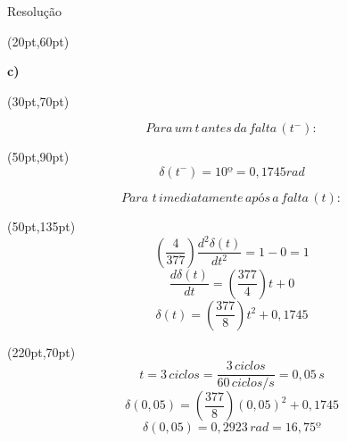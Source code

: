 \begin{frame}{Resolução}
\begin{textblock*}{10pt}(20pt,60pt)

 \textbf{c)}\\
\end{textblock*}


\begin{textblock*}{10pt}(30pt,70pt)    
\small   


\begin{equation*}
  Para\hspace{2pt} um \hspace{2pt} t \hspace{2pt} antes \hspace{2pt} da \hspace{2pt} falta \hspace{2pt} (t^-):
\end{equation*}
\begin{textblock*}{10pt}(50pt,90pt)
\begin{equation*}
  \delta(t^-) = 10º = 0,1745 rad
\end{equation*}
\end{textblock*}
\begin{equation*}
  Para\hspace{2pt} \hspace{2pt} t \hspace{2pt} imediatamente \hspace{2pt} após \hspace{2pt} a \hspace{2pt} falta \hspace{2pt} (t):
\end{equation*}
\begin{textblock*}{10pt}(50pt,135pt)
\begin{equation*}
  \left(\frac{4}{377}\right) \frac{d^{2} \delta(t)}{d t^2} = 1-0 = 1
\end{equation*}
\begin{equation*}
   \frac{d \delta(t)}{d t} = \left(\frac{377}{4} \right)t + 0
\end{equation*}
\begin{equation*}
   \delta(t) = \left(\frac{377}{8} \right)t^2 + 0,1745
\end{equation*}
\end{textblock*}


\begin{textblock*}{10pt}(220pt,70pt)
\begin{equation*}
   t= 3 \hspace{2pt}ciclos = \frac{3 \hspace{2pt} ciclos}{60 \hspace{2pt} ciclos/s} = 0,05 \hspace{2pt}s 
\end{equation*}
\begin{equation*}
   \delta(0,05) = \left(\frac{377}{8} \right)(0,05)^2 + 0,1745
\end{equation*}
\begin{equation*}
   \delta(0,05) = 0,2923 \hspace{2pt} rad = \boxed{16,75º}
\end{equation*}



\end{textblock*}
\end{textblock*}
\end{frame}
